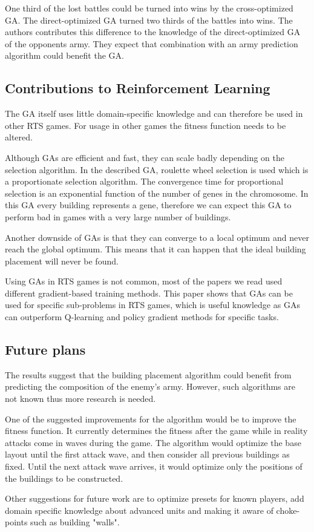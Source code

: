 One third of the lost battles could be turned into wins by the cross-optimized GA. The direct-optimized GA turned two thirds of the battles into wins. The authors contributes this difference to the knowledge of the direct-optimized GA of the opponents army. They expect that combination with an army prediction algorithm could benefit the GA.   

\subsection{Contributions to Reinforcement Learning}

The GA itself uses little domain-specific knowledge and can therefore be used in other RTS games. For usage in other games the fitness function needs to be altered.        

Although GAs are efficient and fast, they can scale badly depending on the selection algorithm. In the described GA, roulette wheel selection is used which is a proportionate selection algorithm. The convergence time for proportional selection is an exponential function of the number of genes in the chromosome\citep{thierens1998domino}. In this GA every building represents a gene, therefore we can expect this GA to perform bad in games with a very large number of buildings.

Another downside of GAs is that they can converge to a local optimum and never reach the global optimum. This means that it can happen that the ideal building placement will never be found.

Using GAs in RTS games is not common, most of the papers we read used different gradient-based training methods. This paper shows that GAs can be used for specific sub-problems in RTS games, which is useful knowledge as GAs can outperform Q-learning and policy gradient methods for specific tasks\citep{DBLP:journals/corr/abs-1712-06567}.

\subsection{Future plans}
The results suggest that the building placement algorithm could benefit from predicting the composition of the enemy's army. However, such algorithms are not known thus more research is needed.

One of the suggested improvements for the algorithm would be to improve the fitness function. It currently determines the fitness after the game while in reality attacks come in waves during the game. The algorithm would optimize the base layout until the first attack wave, and then consider all previous buildings as fixed. Until the next attack wave arrives, it would optimize only the positions of the buildings to be constructed\citep{barriga2014building}.

Other suggestions for future work are to optimize presets for known players, add domain specific knowledge about advanced units and making it aware of choke-points such as building "walls".
